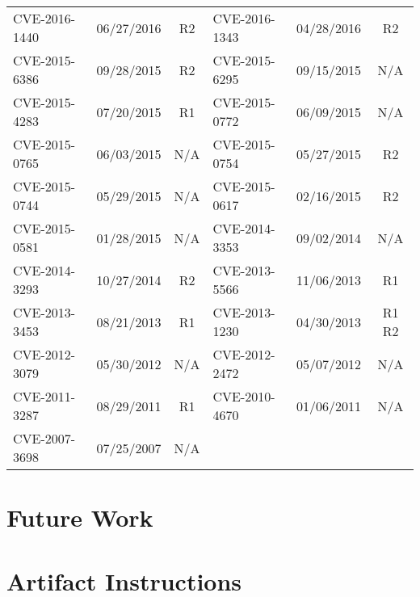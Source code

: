 \begin{appendices}
\begin{table*}[]
\begin{tabular}{lcclcc}
    CVE-2016-1440 & 06/27/2016 & R2 & 
    CVE-2016-1343 & 04/28/2016 & R2 \\
    CVE-2015-6386 & 09/28/2015 & R2 & 
    CVE-2015-6295 & 09/15/2015 & N/A \\
    CVE-2015-4283 & 07/20/2015 & R1 & 
    CVE-2015-0772 & 06/09/2015 & N/A \\
    CVE-2015-0765 & 06/03/2015 & N/A &
    CVE-2015-0754 & 05/27/2015 & R2 \\
    CVE-2015-0744 & 05/29/2015 & N/A & 
    CVE-2015-0617 & 02/16/2015 & R2 \\ %
    CVE-2015-0581 & 01/28/2015 & N/A & 
    CVE-2014-3353 & 09/02/2014 & N/A \\
    CVE-2014-3293 & 10/27/2014 & R2 & 
    CVE-2013-5566 & 11/06/2013 & R1 \\
    CVE-2013-3453 & 08/21/2013 & R1 &
    CVE-2013-1230 & 04/30/2013 & R1 R2 \\
    CVE-2012-3079 & 05/30/2012 & N/A &
    CVE-2012-2472 & 05/07/2012 & N/A \\
    CVE-2011-3287 & 08/29/2011 & R1 & 
    CVE-2010-4670 & 01/06/2011 & N/A \\
    CVE-2007-3698 & 07/25/2007 & N/A \\
    \bottomrule
\end{tabular}
\end{table*}


\section{Future Work}

\section{Artifact Instructions}

\end{appendices}
